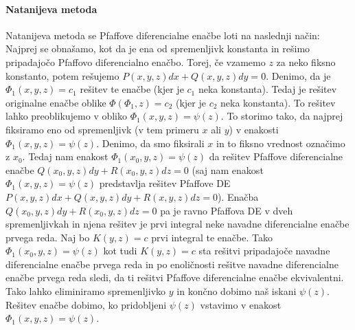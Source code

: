 \documentclass[a4paper, 10pt]{article}
\begin{document}
					\paragraph{Natanijeva metoda}
						Natanijeva metoda se Pfaffove diferencialne enačbe loti na naslednji način: Najprej se obnašamo, kot da je ena od spremenljivk konstanta in rešimo pripadajočo Pfaffovo diferencialno enačbo. Torej, če vzamemo $z$ za neko fiksno konstanto, potem rešujemo $P(x, y, z)dx + Q(x, y, z)dy = 0$. Denimo, da je $\Phi_1(x, y, z) = c_1$ rešitev te enačbe (kjer je $c_1$ neka konstanta). Tedaj je rešitev originalne enačbe oblike $\Phi(\Phi_1, z) = c_2$ (kjer je $c_2$ neka konstanta). To rešitev lahko preoblikujemo v obliko $\Phi_1(x, y, z) = \psi(z)$. To storimo tako, da najprej fiksiramo eno od spremenljivk (v tem primeru $x$ ali $y$) v enakosti $\Phi_1(x, y, z) = \psi(z)$. Denimo, da smo fiksirali $x$ in to fiksno vrednost označimo z $x_0$. Tedaj nam enakost $\Phi_1(x_0, y, z) = \psi(z)$ da rešitev Pfaffove diferencialne enačbe $Q(x_0, y, z)dy + R(x_0, y, z)dz = 0$ (saj nam enakost $\Phi_1(x, y, z) = \psi(z)$ predstavlja rešitev Pfaffove DE $P(x, y, z)dx + Q(x, y, z)dy + R(x, y, z)dz = 0$). Enačba $Q(x_0, y, z)dy + R(x_0, y, z)dz = 0$ pa je ravno Pfaffova DE v dveh spremenljivkah in njena rešitev je prvi integral neke navadne diferencialne enačbe prvega reda. Naj bo $K(y, z) = c$ prvi integral te enačbe. Tako $\Phi_1(x_0, y, z) = \psi(z)$ kot tudi $K(y, z) = c$ sta rešitvi pripadajoče navadne diferencialne enačbe prvega reda in po enoličnosti rešitve navadne diferencialne enačbe prvega reda sledi, da ti rešitvi Pfaffove diferencialne enačbe ekvivalentni. Tako lahko eliminiramo spremenljivko $y$ in končno dobimo naš iskani $\psi(z)$. Rešitev enačbe dobimo, ko pridobljeni $\psi(z)$ vstavimo v enakost $\Phi_1(x, y, z) = \psi(z)$.
						
\end{document}
